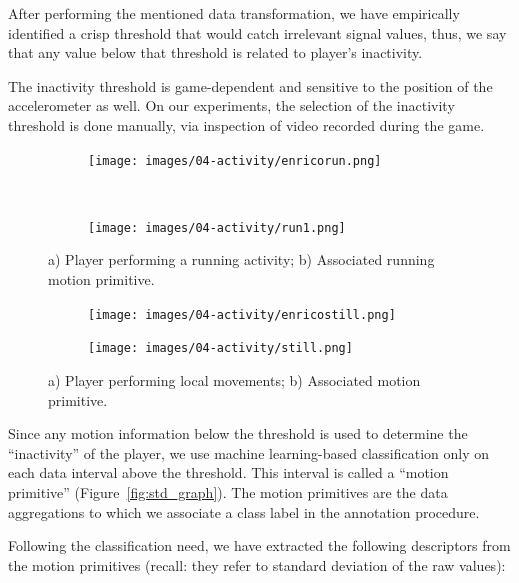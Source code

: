 After performing the mentioned data transformation, we have empirically identified a crisp threshold that would catch irrelevant signal values, thus, we say that any value below that threshold is related to player's inactivity.

The inactivity threshold is game-dependent and sensitive to the position of the accelerometer as well. On our experiments, the selection of the inactivity threshold is done manually, via inspection of video recorded during the game.

\begin{figure}[H]
    \centering
    \begin{subfigure}[b]{0.3\textwidth}
     	\centering
        \texttt{[image: images/04-activity/enricorun.png]}
        \caption{}
	\end{subfigure}
	~
    \begin{subfigure}[b]{0.3\textwidth}
     	\centering
        \texttt{[image: images/04-activity/run1.png]}
        \caption{}
	\end{subfigure}
	\caption{a) Player performing a running activity;  b) Associated running motion primitive.}\label{fig:running}
\end{figure}

\begin{figure}[H]
  \centering
  \begin{subfigure}[b]{0.3\textwidth}
  	 \centering
      \texttt{[image: images/04-activity/enricostill.png]}
      \caption{}
  \end{subfigure}
  \begin{subfigure}[b]{0.3\textwidth}
  	 \centering
      \texttt{[image: images/04-activity/still.png]}
      \caption{}
  \end{subfigure}
  \caption{a) Player performing local movements; b) Associated motion primitive.}    
  \label{fig:localmov}
\end{figure}
    
Since any motion information below the threshold is used to determine the ``inactivity'' of the player, we use machine learning-based classification only on each data interval above the threshold. This interval is called a ``motion primitive'' (Figure~\ref{fig:std_graph}). The motion primitives are the data aggregations to which we associate a class label in the annotation procedure. 

Following the classification need, we have extracted the following descriptors from the motion primitives (recall: they refer to standard deviation of the raw values): 

